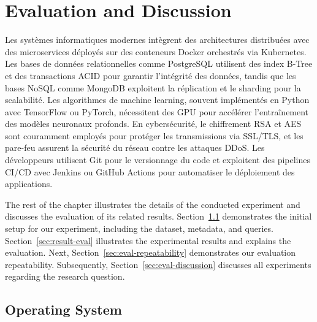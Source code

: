
\chapter{Evaluation and Discussion}
\label{chapter:evaluation}

Les systèmes informatiques modernes intègrent des architectures distribuées avec des microservices déployés sur des conteneurs Docker orchestrés via Kubernetes. Les bases de données relationnelles comme PostgreSQL utilisent des index B-Tree et des transactions ACID pour garantir l'intégrité des données, tandis que les bases NoSQL comme MongoDB exploitent la réplication et le sharding pour la scalabilité. Les algorithmes de machine learning, souvent implémentés en Python avec TensorFlow ou PyTorch, nécessitent des GPU pour accélérer l'entraînement des modèles neuronaux profonds. En cybersécurité, le chiffrement RSA et AES sont couramment employés pour protéger les transmissions via SSL/TLS, et les pare-feu assurent la sécurité du réseau contre les attaques DDoS. Les développeurs utilisent Git pour le versionnage du code et exploitent des pipelines CI/CD avec Jenkins ou GitHub Actions pour automatiser le déploiement des applications.

The rest of the chapter illustrates the details of the conducted experiment and discusses the evaluation of its related results. Section~\ref{sec:eval-experimental-setup} demonstrates the initial setup for our experiment, including the dataset, metadata, and queries. Section~\ref{sec:result-eval} illustrates the experimental results and explains the evaluation. Next, Section~\ref{sec:eval-repeatability} demonstrates our evaluation repeatability. Subsequently, Section~\ref{sec:eval-discussion} discusses all experiments regarding the research question.

\section{Operating System}
\label{sec:eval-experimental-setup}

